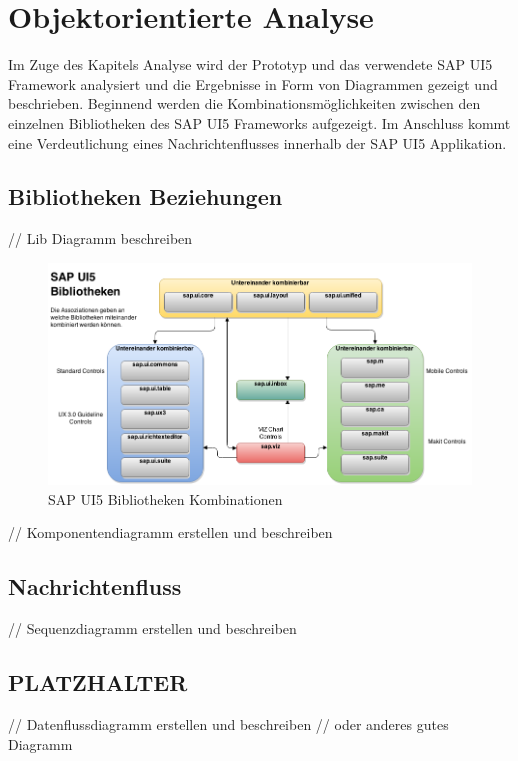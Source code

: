 \section{Objektorientierte Analyse}\label{analyse}
Im Zuge des Kapitels Analyse wird der Prototyp und das verwendete SAP UI5 Framework analysiert und die Ergebnisse in Form von Diagrammen gezeigt und beschrieben. Beginnend werden die Kombinationsmöglichkeiten zwischen den einzelnen Bibliotheken des SAP UI5 Frameworks aufgezeigt. Im Anschluss kommt eine Verdeutlichung eines Nachrichtenflusses innerhalb der SAP UI5 Applikation.

\subsection{Bibliotheken Beziehungen}
// Lib Diagramm beschreiben

\vspace{1em}
\begin{figure}[htb]
  \centering
  \includegraphics[width=1\linewidth]{abb/sapui5libconnections}
  \caption[SAP UI5 Bibliotheken Kombinationen]{SAP UI5 Bibliotheken Kombinationen}
  \label{fig:sapui5libconnections}
\end{figure}

// Komponentendiagramm erstellen und beschreiben

\subsection{Nachrichtenfluss}
// Sequenzdiagramm erstellen und beschreiben

\subsection{PLATZHALTER}
// Datenflussdiagramm erstellen und beschreiben
// oder anderes gutes Diagramm